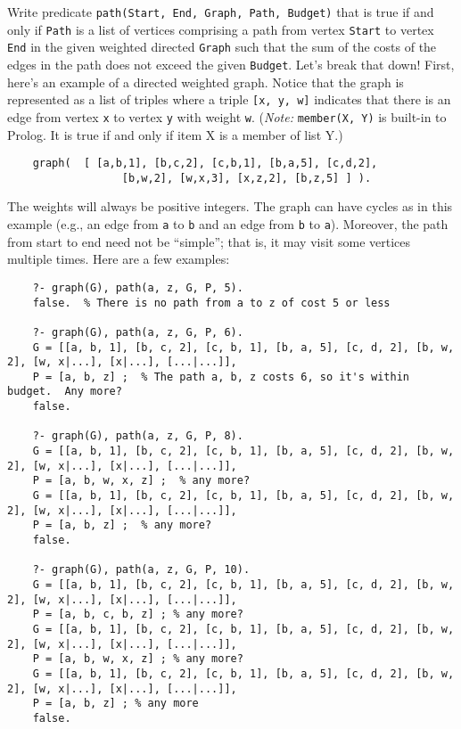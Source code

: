 \documentclass[12pt]{article}
\begin{document}
	Write predicate \verb+path(Start, End, Graph, Path, Budget)+ that is true if and only if \verb+Path+ is a list of vertices comprising a path from vertex \verb+Start+ to vertex \verb+End+ in the given weighted directed \verb+Graph+ such that the sum of the costs of the edges in the path does not exceed the given \verb+Budget+.  Let's break that down!  First, here's an example of a directed weighted graph.  Notice that the graph is represented as a list of triples where a triple \verb+[x, y, w]+ indicates that there is an edge from vertex \verb+x+ to vertex \verb+y+ with weight \verb+w+.  (\emph{Note:}  \verb+member(X, Y)+ is built-in to Prolog.  It is true if and only if item X is a member of list Y.)
	\begin{verbatim}
	graph(  [ [a,b,1], [b,c,2], [c,b,1], [b,a,5], [c,d,2], 
		          [b,w,2], [w,x,3], [x,z,2], [b,z,5] ] ).
	\end{verbatim}
	The weights will always be positive integers.  The graph can have cycles as in this example (e.g., an edge from \verb+a+ to \verb+b+ and an edge from \verb+b+ to \verb+a+).  Moreover, the path from start to end need not be ``simple''; that is, it may visit some vertices multiple times.  Here are a few examples:

    {\scriptsize
	\begin{verbatim}
	?- graph(G), path(a, z, G, P, 5).
	false.  % There is no path from a to z of cost 5 or less
	
	?- graph(G), path(a, z, G, P, 6).
	G = [[a, b, 1], [b, c, 2], [c, b, 1], [b, a, 5], [c, d, 2], [b, w, 2], [w, x|...], [x|...], [...|...]],
	P = [a, b, z] ;  % The path a, b, z costs 6, so it's within budget.  Any more?
	false.
	
	?- graph(G), path(a, z, G, P, 8).
	G = [[a, b, 1], [b, c, 2], [c, b, 1], [b, a, 5], [c, d, 2], [b, w, 2], [w, x|...], [x|...], [...|...]],
	P = [a, b, w, x, z] ;  % any more?
	G = [[a, b, 1], [b, c, 2], [c, b, 1], [b, a, 5], [c, d, 2], [b, w, 2], [w, x|...], [x|...], [...|...]],
	P = [a, b, z] ;  % any more?
	false.
	
	?- graph(G), path(a, z, G, P, 10).
	G = [[a, b, 1], [b, c, 2], [c, b, 1], [b, a, 5], [c, d, 2], [b, w, 2], [w, x|...], [x|...], [...|...]],
	P = [a, b, c, b, z] ; % any more?
	G = [[a, b, 1], [b, c, 2], [c, b, 1], [b, a, 5], [c, d, 2], [b, w, 2], [w, x|...], [x|...], [...|...]],
	P = [a, b, w, x, z] ; % any more?
	G = [[a, b, 1], [b, c, 2], [c, b, 1], [b, a, 5], [c, d, 2], [b, w, 2], [w, x|...], [x|...], [...|...]],
	P = [a, b, z] ; % any more
	false.
	\end{verbatim}
    }
\end{document}

